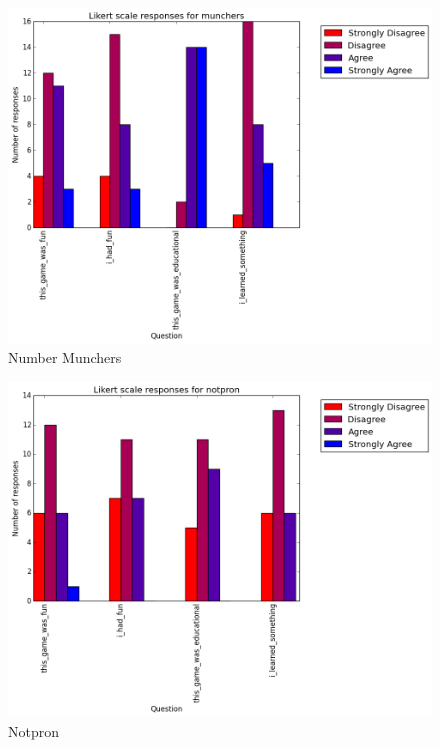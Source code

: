 			\begin{figure}[h] 
			\centering 
			\includegraphics[width=\textwidth]{munchers_likert.png} 
			\caption{Number Munchers}
			\end{figure}

			\begin{figure}[h] 
			\centering 
			\includegraphics[width=\textwidth]{notpron_likert.png} 
			\caption{Notpron}
			\end{figure}

